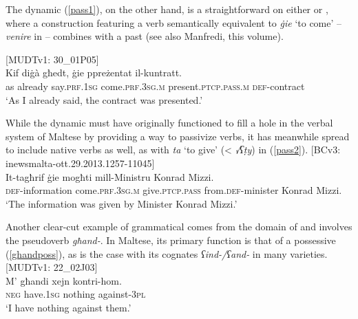 \documentclass[output=paper]{langsci/langscibook}
\begin{document}
The dynamic  (\ref{pass1}), on the other hand, is a straightforward  on either  or , where a construction featuring a verb semantically equi\-valent to \textit{ġie} `to come' -- \textit{venire} in  -- combines with a past  (see also Manfredi, this volume).

\ea\label{pass1}
{[MUDTv1: 30\_01P05]} \\
\gll Kif diġà għedt, ġie ppreżentat il-kuntratt.\\
	as already say.\textsc{prf.1sg} come.\textsc{prf.3sg.m} present.\textsc{ptcp.pass.m} \textsc{def}-contract\\
	\glt `As I already said, the contract was presented.'\\
\z

While the dynamic  must have originally functioned to fill a hole in the verbal system of Maltese by providing a way to passivize  verbs, it has meanwhile spread to include native verbs as well, as with \textit{ta} `to give' (< \textit{√ʕṭy}) in (\ref{pass2}).
\ea\label{pass2}
{[BCv3: inewsmalta-ott.29.2013.1257-11045]} \\
\gll It-tagħrif ġie mogħti mill-Ministru Konrad Mizzi.\\
	\textsc{def}-information come.\textsc{prf.3sg.m} give.\textsc{ptcp.pass} from.\textsc{def}-minister Konrad Mizzi.\\
	\glt `The information was given by Minister Konrad Mizzi.'\\
\z

Another clear-cut example of grammatical  comes from the domain of  and involves the pseudoverb \textit{għand-}. In Maltese, its primary function is that of a possessive (\ref{ghandposs}), as is the case with its cognates \textit{ʕind-/ʕand-} in many  varieties.
\ea\label{ghandposs}
{[MUDTv1: 22\_02J03]} \\
    \gll M' għandi xejn kontri-hom.\\
	\textsc{neg} have.\textsc{1sg} nothing against-\textsc{3pl}\\
	\glt `I have nothing against them.'\\
\z
\end{document}
